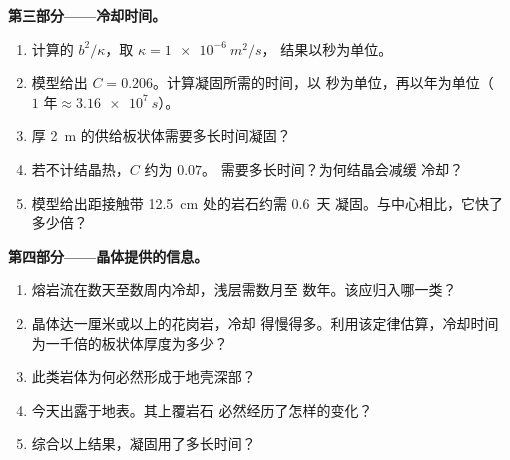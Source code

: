 \begin{problem}
\medskip
\noindent\textbf{第三部分——冷却时间。}
\begin{enumerate}[resume]
  \item 计算的 $b^2/\kappa$，取 $\kappa = \qty{1e-6}{m^2/s}$，
        结果以秒为单位。
  \item 模型给出 $C = 0.206$。计算凝固所需的时间，以
        秒为单位，再以年为单位（$\num{1}\text{ 年} \approx \qty{3.16e7}{s}$）。
  \item 厚 \qty{2}{m} 的供给板状体需要多长时间凝固？
  \item 若不计结晶热，$C$ 约为 $0.07$。
        需要多长时间？为何结晶会减缓
        冷却？
  \item 模型给出距接触带 \qty{12.5}{cm} 处的岩石约需 \num{0.6}~天
        凝固。与中心相比，它快了
        多少倍？
\end{enumerate}

\medskip
\noindent\textbf{第四部分——晶体提供的信息。}
\begin{enumerate}[resume]
  \item 熔岩流在数天至数周内冷却，浅层需数月至
        数年。该应归入哪一类？
  \item 晶体达一厘米或以上的花岗岩，冷却
        得慢得多。利用该定律估算，冷却时间
        为一千倍的板状体厚度为多少？
  \item 此类岩体为何必然形成于地壳深部？
  \item 今天出露于地表。其上覆岩石
        必然经历了怎样的变化？
  \item 综合以上结果，凝固用了多长时间？
\end{enumerate}
\end{problem}
